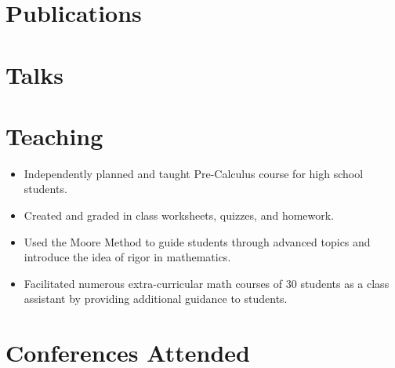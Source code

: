 \documentclass{cultvoucher}
\begin{document}
\section{Publications}

\section{Talks}

\section{Teaching}
\begin{itemize}
    \vspace{-0.25em}
    \item Independently planned and taught Pre-Calculus course for high school
          students.
    \item Created and graded in class worksheets, quizzes, and homework.
    \item Used the Moore Method to guide students through advanced topics and
          introduce the idea of rigor in mathematics.
\end{itemize}

\begin{itemize}
    \vspace{-0.25em}
    \item Facilitated numerous extra-curricular math courses of 30 students as
          a class assistant by providing additional guidance to students.
\end{itemize}

\section{Conferences Attended}




\end{document}
